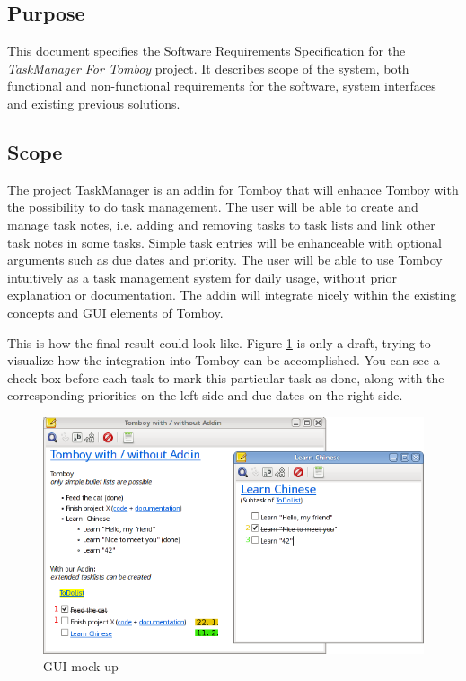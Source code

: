 \subsection{Purpose}
\label{intro:purpose}
This document specifies the Software Requirements Specification for the \textit{TaskManager For Tomboy} project.
It describes scope of the system, both functional and non-functional requirements for the software, system interfaces and existing previous solutions.


\subsection{Scope}
\label{intro:scope}
The project TaskManager is an addin for Tomboy that will enhance Tomboy with the possibility to do task management. 
The user will be able to create and manage task notes, i.e. adding and removing tasks to task lists and link other task notes in some tasks.
Simple task entries will be enhanceable with optional arguments such as due dates and priority.
The user will be able to use Tomboy intuitively as a task management system for daily usage, without prior explanation or documentation. 
The addin will integrate nicely within the existing concepts and GUI elements of Tomboy.

This is how the final result could look like. Figure \ref{gui} is only a draft, trying to visualize how the integration into Tomboy can be accomplished. You can see a check box before each task to mark this particular task as done, along with the corresponding priorities on the left side and due dates on the right side.
\begin{figure}[h]
  \includegraphics[width=\textwidth]{graphics/Screenshot_cropped_edited.png}
  \caption{GUI mock-up}
  \label{gui}
\end{figure}


